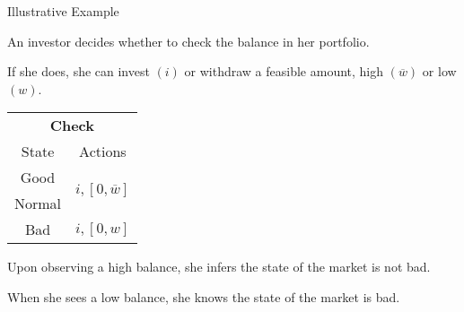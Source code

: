 \documentclass[usenames,dvipsnames,aspectratio=169,11pt, envcountsect, handout]{beamer}
\begin{document}
\begin{frame}{Illustrative Example}

	An investor decides whether to check the balance in her portfolio.

	\vfill

	If she does, she can invest \( \left( i \right) \) or withdraw a feasible amount, high \( \left( \overline{w} \right) \) or low \( \left( w \right) \). \pause

	\vfill

	\begin{table}[H]
		\centering
		\begin{minipage}{0.29\textwidth}

		\end{minipage}\hspace{0.3cm} %
		\begin{minipage}{0.29\textwidth}
			\centering
			\begin{tabular}{c | c}
				\multicolumn{2}{c}{\textbf{Check}}                                                            \\
				State                & Actions                                                                \\
				\hline
				{\color{blue}Good}   & \multirow{2}{*}{{\color{blue}\( i, \left[ 0, \overline{w} \right] \)}} \\
				{\color{blue}Normal} &                                                                        \\
				Bad                  & \(  i, \left[0, w \right] \)                                           \\
			\end{tabular}
			\vspace{0.5cm} %
		\end{minipage}\hspace{0.3cm} %
		\begin{minipage}{0.29\textwidth}

		\end{minipage}
	\end{table} \pause

	\vfill

	Upon observing a high balance, she infers the state of the market is not bad.

	\vfill

	When she sees a low balance, she knows the state of the market is bad.

\end{frame}
\end{document}
